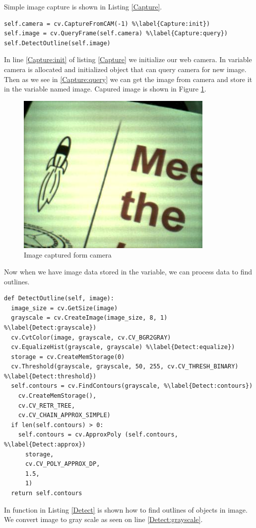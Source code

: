 \documentclass{ifacconf}
\begin{document}
Simple image capture is shown in Listing \ref{Capture}.
\begin{lstlisting}[caption=Query image frame from web camera, label=Capture]
self.camera = cv.CaptureFromCAM(-1) %\label{Capture:init})
self.image = cv.QueryFrame(self.camera) %\label{Capture:query})
self.DetectOutline(self.image)
\end{lstlisting}
In line \ref{Capture:init} of listing \ref{Capture} we initialize our web
camera. In variable camera is allocated and initialized object that can query
camera for new image. Then as we see in \ref{Capture:query} we can get the
image from camera and store it in the variable named image. Capured image
is shown in Figure \ref{fig:captured}.

\begin{figure}[h]
\includegraphics[width=\columnwidth]{images/1test.png}
\caption{Image captured form camera}
\label{fig:captured}
\end{figure}

Now when we have
image data stored in the variable, we can process data to find outlines.
\begin{lstlisting}[caption=Outline detection, label=Detect]
def DetectOutline(self, image):
  image_size = cv.GetSize(image)
  grayscale = cv.CreateImage(image_size, 8, 1)	%\label{Detect:grayscale})
  cv.CvtColor(image, grayscale, cv.CV_BGR2GRAY)
  cv.EqualizeHist(grayscale, grayscale)	%\label{Detect:equalize})
  storage = cv.CreateMemStorage(0)
  cv.Threshold(grayscale, grayscale, 50, 255, cv.CV_THRESH_BINARY) %\label{Detect:threshold})
  self.contours = cv.FindContours(grayscale, %\label{Detect:contours})
    cv.CreateMemStorage(),
    cv.CV_RETR_TREE,
    cv.CV_CHAIN_APPROX_SIMPLE)
  if len(self.contours) > 0:
    self.contours = cv.ApproxPoly (self.contours, %\label{Detect:approx})
      storage,
      cv.CV_POLY_APPROX_DP,
      1.5,
      1)
  return self.contours
\end{lstlisting}
In function in Listing \ref{Detect} is shown how to find outlines of objects in
image. We convert image to gray scale as seen on line \ref{Detect:grayscale}.
\end{document}
